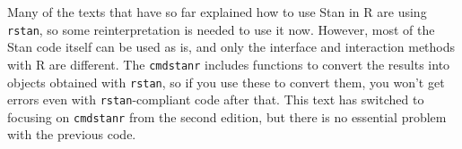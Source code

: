 \documentclass{ltjsbook}
\begin{document}
Many of the texts that have so far explained how to use Stan in R are using \verb|rstan|, so some reinterpretation is needed to use it now. However, most of the Stan code itself can be used as is, and only the interface and interaction methods with R are different. The \verb|cmdstanr| includes functions to convert the results into objects obtained with \verb|rstan|, so if you use these to convert them, you won't get errors even with \verb|rstan|-compliant code after that. This text has switched to focusing on \verb|cmdstanr| from the second edition, but there is no essential problem with the previous code.

\end{document}
